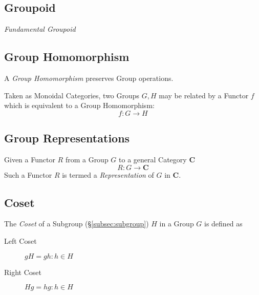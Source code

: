 \subsection{Groupoid}\label{subsec:groupoid}

\emph{Fundamental Groupoid}



\subsection{Group Homomorphism}\label{subsec:group_homomorphism}

A \emph{Group Homomorphism} preserves Group operations.

Taken as Monoidal Categories, two Groups $G, H$ may be related by a
Functor $f$ which is equivalent to a Group Homomorphism:
\[
    f : G \rightarrow H
\]



\subsection{Group Representations}\label{subsec:group_representation}

Given a Functor $R$ from a Group $G$ to a general Category
$\mathbf{C}$
\[
    R : G \rightarrow \mathbf{C}
\]
Such a Functor $R$ is termed a \emph{Representation} of $G$ in
$\mathbf{C}$.



\subsection{Coset}\label{subsec:group_coset}

The \emph{Coset} of a Subgroup (\S\ref{subsec:subgroup}) $H$ in a Group $G$
is defined as
\begin{description}
\item[Left Coset] $gH = {gh : h \in H}$
\item[Right Coset] $Hg = {hg : h \in H}$
\end{description}



